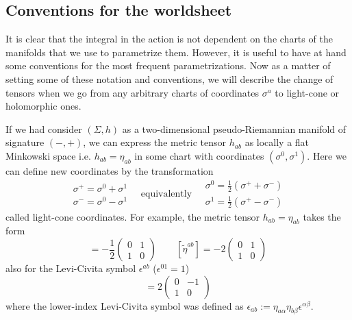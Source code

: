 \documentclass[a4paper,12pt]{article}
\numberwithin{equation}{section}
\numberwithin{thm}{section}
\numberwithin{exm}{section}
\newcommand{\wt}{\widetilde}
\newcommand{\<}{{\langle}}
\renewcommand{\>}{{\rangle}}
\renewcommand{\a}{{\alpha}}
\renewcommand{\b}{{\beta}}
\newcommand{\e}{{\epsilon}}
\newcommand{\s}{{\sigma}}
\begin{document}
\subsection{Conventions for the worldsheet}
It is clear that the integral in the action is not dependent on the charts of the manifolds that we use to parametrize them. However, it is useful to have at hand some conventions for the most frequent parametrizations. Now as a matter of setting some of these notation and conventions, we will describe the change of tensors when we go from any arbitrary charts of coordinates $\s^a$ to light-cone or holomorphic ones.

If we had consider $(\Sigma,h)$ as a two-dimensional pseudo-Riemannian manifold of signature $(-,+)$, we can express the metric tensor $h_{ab}$ as locally a flat Minkowski space i.e. $h_{ab} = \eta_{ab}$ in some chart with coordinates $(\s^0, \s^1)$. Here we can define new coordinates by the transformation
	\begin{equation}
		\begin{array}{l}
			\s^+ = \s^0 + \s^1 \\
			\s^- = \s^0 - \s^1
		\end{array}
		\quad\text{equivalently}\quad
		\begin{array}{l}
			\s^0 = \frac{1}{2}(\s^+ + \s^-) \\
			\s^1 = \frac{1}{2}(\s^+ - \s^-)
		\end{array}
	\end{equation}
called light-cone coordinates. For example, the metric tensor $h_{ab} = \eta_{ab}$ takes the form
	\begin{equation}
	[\wt{\eta}_{ab}] = -\frac{1}{2}\left(\begin{array}{ll}0&1\\1&0\end{array}\right)\qquad
	[\wt{\eta}^{ab}] = -2 \left(\begin{array}{ll}0&1\\1&0\end{array}\right)
	\end{equation}
also for the Levi-Civita symbol $\e^{ab}$ ($\epsilon^{01} = 1$)
	\begin{equation}
	[\wt\epsilon^{ab}] = 2 \left(
		\begin{array}{cc}
		0 & -1 \\
		1 & 0
		\end{array}
	\right)
	\end{equation}
where the lower-index Levi-Civita symbol was defined as $\e_{ab} := \eta_{a\a}\eta_{b\b} \e^{\a\b}$.
\end{document}
